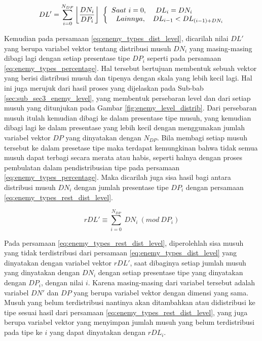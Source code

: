 \begin{equation}\label{eq:enemy_types_dist_level}
\begin{split}
DL' = \sum_{i = 0}^{N_{DP}} \left \lfloor \frac{DN_{i}}{DP_{i}} \right \rfloor\
\left\{\begin{matrix} 
\hspace{0.5em} Saat\ i = 0, & \hspace{-4.0em}DL_{i} = DN_{i} \\ 
\hspace{1.0em} Lainnya, & DL_{i - 1} < DL_{(i - 1) + DN_{i}}
\end{matrix}\right.
\end{split}
\end{equation}

Kemudian pada persamaan \ref{eq:enemy_types_dist_level}, dicarilah nilai $DL'$ yang berupa variabel vektor tentang distribusi musuh $DN_{i}$ yang masing-masing dibagi lagi dengan setiap presentase tipe $DP_{i}$ seperti pada persamaan \ref{eq:enemy_types_percentage}. Hal tersebut bertujuan membentuk sebuah vektor yang berisi distribusi musuh dan tipenya dengan skala yang lebih kecil lagi. Hal ini juga merujuk dari hasil proses yang dijelaskan pada Sub-bab \ref{sec:sub_sec3_enemy_level}, yang membentuk persebaran level dan dari setiap musuh yang ditunjukan pada Gambar \ref{fig:enemy_level_distrib}. Dari persebaran musuh itulah kemudian dibagi ke dalam presentase tipe musuh, yang kemudian dibagi lagi ke dalam presentase yang lebih kecil dengan menggunakan jumlah variabel vektor $DP$ yang dinyatakan dengan $N_{DP}$. Bila membagi setiap musuh tersebut ke dalam presetase tipe maka terdapat kemungkinan bahwa tidak semua musuh dapat terbagi secara merata atau habis, seperti halnya dengan proses pembulatan dalam pendistribusian tipe pada persamaan \ref{eq:enemy_types_percentage}. Maka dicarilah juga sisa hasil bagi antara distribusi musuh $DN_{i}$ dengan jumlah presentase tipe $DP_{i}$ dengan persamaan \ref{eq:enemy_types_rest_dist_level}.
\vspace{1ex}

\begin{equation}\label{eq:enemy_types_rest_dist_level}
rDL' \equiv \sum_{i = 0}^{N_{DP}}\ DN_{i}\ (mod\ DP_{i})
\end{equation}

Pada persamaan \ref{eq:enemy_types_rest_dist_level}, diperolehlah sisa musuh yang tidak terdistribusi dari persamaan \ref{eq:enemy_types_dist_level} yang dinyatakan dengan variabel vektor $rDL'$, saat dibaginya setiap jumlah musuh yang dinyatakan dengan $DN_{i}$ dengan setiap presentase tipe yang dinyatakan dengan $DP_{i}$, dengan nilai $i$. Karena masing-masing dari variabel tersebut adalah variabel $DN'$ dan $DP$ yang berupa variabel vektor dengan dimensi yang sama. Musuh yang belum terdistribusi nantinya akan ditambahkan atau didistribusi ke tipe sesuai hasil dari persamaan \ref{eq:enemy_types_rest_dist_level}, yang juga berupa variabel vektor yang menyimpan jumlah musuh yang belum terdistribusi pada tipe ke $i$ yang dapat dinyatakan dengan $rDL_{i}$.
\vspace{1ex}

